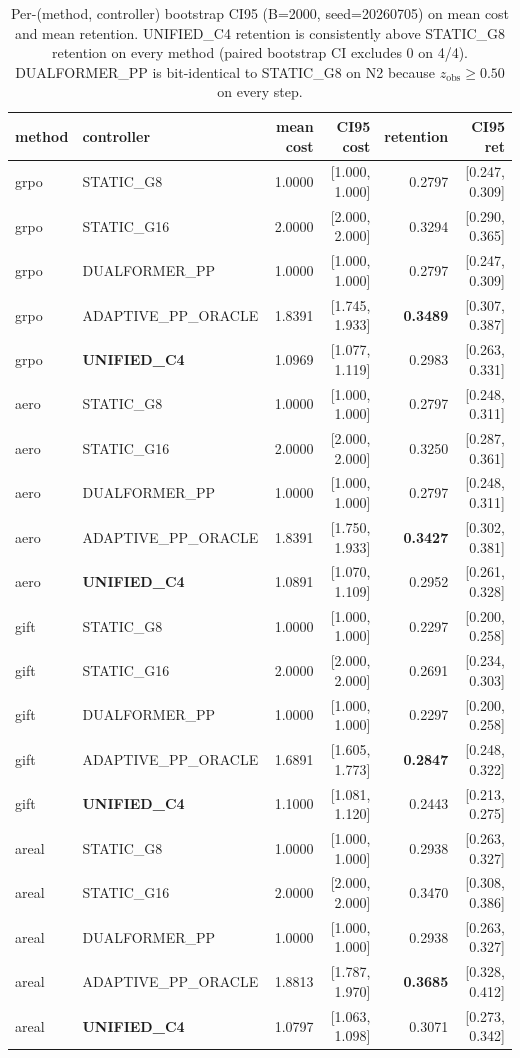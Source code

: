 \begin{table}[ht]
\centering
\small
\begin{tabular}{llrrrr}
\toprule
method & controller & mean cost & CI95 cost & retention & CI95 ret \\
\midrule
grpo   & STATIC\_G8          & 1.0000 & [1.000, 1.000] & 0.2797 & [0.247, 0.309] \\
grpo   & STATIC\_G16         & 2.0000 & [2.000, 2.000] & 0.3294 & [0.290, 0.365] \\
grpo   & DUALFORMER\_PP      & 1.0000 & [1.000, 1.000] & 0.2797 & [0.247, 0.309] \\
grpo   & ADAPTIVE\_PP\_ORACLE & 1.8391 & [1.745, 1.933] & \textbf{0.3489} & [0.307, 0.387] \\
grpo   & \textbf{UNIFIED\_C4} & 1.0969 & [1.077, 1.119] & 0.2983 & [0.263, 0.331] \\
\midrule
aero   & STATIC\_G8          & 1.0000 & [1.000, 1.000] & 0.2797 & [0.248, 0.311] \\
aero   & STATIC\_G16         & 2.0000 & [2.000, 2.000] & 0.3250 & [0.287, 0.361] \\
aero   & DUALFORMER\_PP      & 1.0000 & [1.000, 1.000] & 0.2797 & [0.248, 0.311] \\
aero   & ADAPTIVE\_PP\_ORACLE & 1.8391 & [1.750, 1.933] & \textbf{0.3427} & [0.302, 0.381] \\
aero   & \textbf{UNIFIED\_C4} & 1.0891 & [1.070, 1.109] & 0.2952 & [0.261, 0.328] \\
\midrule
gift   & STATIC\_G8          & 1.0000 & [1.000, 1.000] & 0.2297 & [0.200, 0.258] \\
gift   & STATIC\_G16         & 2.0000 & [2.000, 2.000] & 0.2691 & [0.234, 0.303] \\
gift   & DUALFORMER\_PP      & 1.0000 & [1.000, 1.000] & 0.2297 & [0.200, 0.258] \\
gift   & ADAPTIVE\_PP\_ORACLE & 1.6891 & [1.605, 1.773] & \textbf{0.2847} & [0.248, 0.322] \\
gift   & \textbf{UNIFIED\_C4} & 1.1000 & [1.081, 1.120] & 0.2443 & [0.213, 0.275] \\
\midrule
areal  & STATIC\_G8          & 1.0000 & [1.000, 1.000] & 0.2938 & [0.263, 0.327] \\
areal  & STATIC\_G16         & 2.0000 & [2.000, 2.000] & 0.3470 & [0.308, 0.386] \\
areal  & DUALFORMER\_PP      & 1.0000 & [1.000, 1.000] & 0.2938 & [0.263, 0.327] \\
areal  & ADAPTIVE\_PP\_ORACLE & 1.8813 & [1.787, 1.970] & \textbf{0.3685} & [0.328, 0.412] \\
areal  & \textbf{UNIFIED\_C4} & 1.0797 & [1.063, 1.098] & 0.3071 & [0.273, 0.342] \\
\bottomrule
\end{tabular}
\caption{Per-(method, controller) bootstrap CI95 (B=2000, seed=20260705) on
mean cost and mean retention. UNIFIED\_C4 retention is consistently above
STATIC\_G8 retention on every method (paired bootstrap CI excludes 0 on 4/4).
DUALFORMER\_PP is bit-identical to STATIC\_G8 on N2 because $z_{\mathrm{obs}} \geq 0.50$ on every step.}
\label{tab:p7-iter159-per-method-ci}
\end{table}

